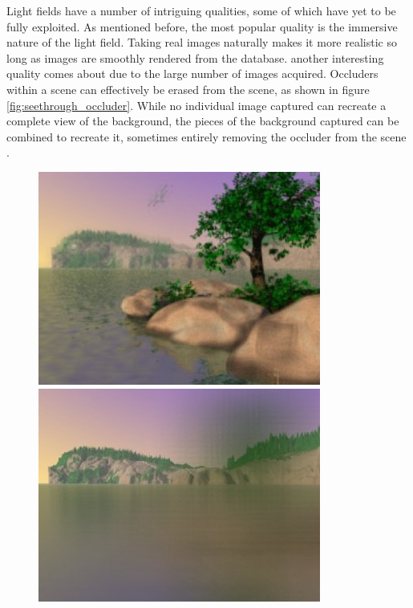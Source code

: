 \documentclass[12pt]{report}
\begin{document}
Light fields have a number of intriguing qualities, some of which have yet to be fully exploited. As mentioned before, the most popular quality is the immersive nature of the light field. Taking real images naturally makes it more realistic so long as images are smoothly rendered from the database. another interesting quality comes about due to the large number of images acquired. Occluders within a scene can effectively be erased from the scene, as shown in figure \ref{fig:seethrough_occluder}. While no individual image captured can recreate a complete view of the background, the pieces of the background captured can be combined to recreate it, sometimes entirely removing the occluder from the scene \cite{Vaish06}.
\begin{figure}[!ht]
	\centering
	\begin{minipage}{0.45\textwidth}
		\centering
		\includegraphics[scale=0.55]{seethrough_occluder.png}
		\caption{}
		\label{fig:seethrough_occluder}
	\end{minipage}\hfill
	\begin{minipage}{0.45\textwidth}
		\centering
		\includegraphics[scale=0.55]{seethrough_occluder2.png}
		\caption{}
		\label{fig:seethrough_occluder2}
	\end{minipage}
\end{figure}
\end{document}
